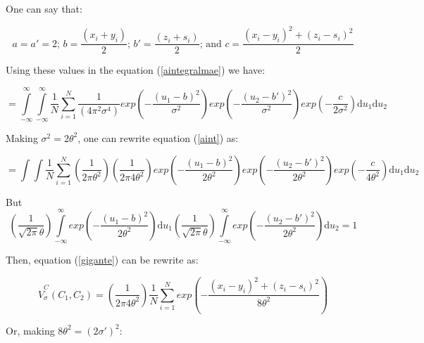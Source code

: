 \documentclass[preprint,12pt]{elsarticle}
\begin{document}
One can say that:

\begin{equation}\nonumber
a = a' = 2 \text{; }
b = \frac{(x_{i}+y_{i})}{2} \text{; }
b' = \frac{(z_{i}+s_{i})}{2} \text{; and }
c = \frac{(x_{i}-y_{i})^2 + (z_{i}-s_{i})^2}{2}
\end{equation}

Using these values in the equation (\ref{aintegralmae}) we have:

\begin{equation}\label{aint}
= \int\limits_{-\infty}^{\infty}\int\limits_{-\infty}^{\infty} \frac{1}{N}\sum\limits_{i=1}^N \frac{1}{(4\pi^{2}\sigma^{4})} exp \left ( - \frac{(u_1-b)^{2}}{\sigma^{2}}   \right) exp \left( - \frac{(u_2-b')^{2}}{\sigma^{2}}  \right)  exp \left( - \frac{c}{2\sigma^{2}} \right ) \mathrm{d}u_1\mathrm{d}u_2
\end{equation}

Making $\sigma^2 = 2\theta^2$, one can rewrite equation (\ref{aint}) as: 

\begin{small}
\begin{equation}\label{gigante}
=\int\int \frac{1}{N}\sum\limits_{i=1}^N \left ( \frac{1}{2\pi\theta^2} \right ) \left ( \frac{1}{2\pi4\theta^2} \right ) exp \left ( - \frac{(u_1-b)^{2}}{2\theta^2}   \right) exp \left( - \frac{(u_2-b')^{2}}{2\theta^{2}}  \right)  exp \left( - \frac{c}{4\theta^2} \right ) \mathrm{d}u_1\mathrm{d}u_2
\end{equation}
\end{small}

But
\begin{equation}\label{integralFechada2}
 \left (\frac{1}{\sqrt{2\pi}\theta} \right )  \int\limits_{-\infty}^{\infty} exp \left ( - \frac{ (u_1-b)^2}{2\theta^2} \right)\mathrm{d}u_1 \left (\frac{1}{\sqrt{2\pi}\theta} \right ) \int\limits_{-\infty}^{\infty}  exp \left ( - \frac{(u_2-b')^2}{2\theta^2}  \right) \mathrm{d}u_2 = 1
\end{equation}

Then, equation (\ref{gigante}) can be rewrite as: 

\begin{equation}\nonumber
\hat{V}^{C}_{\sigma}(C_{1},C_{2}) = \left ( \frac{1}{2\pi4\theta^2} \right )  \frac{1}{N}\sum\limits_{i=1}^N  exp  \left( - \frac{(x_{i}-y_{i})^2 + (z_{i}-s_{i})^2}{8\theta^2} \right )  
\end{equation}

Or, making $8\theta^2 = (2\sigma') ^2$:
\end{document}

